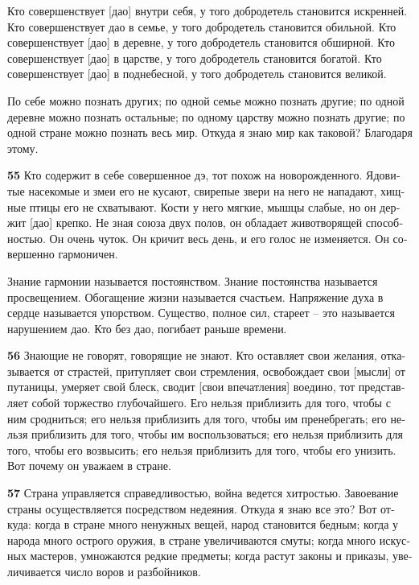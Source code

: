 \documentclass[a4paper]{article}
\begin{document}
{
Кто совершенствует [дао] внутри себя, у того добродетель становится искренней. Кто совершенствует дао в семье, у того
добродетель становится обильной. Кто совершенствует [дао] в деревне, у того добродетель становится обширной. Кто
совершенствует [дао] в царстве, у того добродетель становится богатой. Кто совершенствует [дао] в поднебесной, у того
добродетель становится великой.}

{
По себе можно познать других; по одной семье можно познать другие; по одной деревне можно познать остальные; по одному
царству можно познать другие; по одной стране можно познать весь мир. Откуда я знаю мир как таковой? Благодаря этому.}

{\ttfamily
\foreignlanguage{russian}{\textrm{\textbf{55}}}\foreignlanguage{russian}{\textrm{ Кто содержит в себе совершенное дэ,
тот похож на новорожденного. Ядовитые насекомые и змеи }}\foreignlanguage{russian}{\textrm{его не кусают, свирепые
звери на него не нападают, хищные птицы его не схватывают. Кости у него мягкие, мышцы слабые, но он держит [дао]
крепко. Не зная союза двух полов, он обладает животворящей способностью. Он очень чуток. Он кричит весь день, и его
голос не изменяется. Он совершенно гармоничен.}}}

{
Знание гармонии называется постоянством. Знание постоянства называется просвещением. Обогащение жизни называется
счастьем. Напряжение духа в сердце называется упорством. Существо, полное сил, стареет – это называется нарушением дао.
Кто без дао, погибает раньше времени.}

{\ttfamily
\foreignlanguage{russian}{\textrm{\textbf{56}}}\foreignlanguage{russian}{\textrm{ Знающие не говорят, говорящие не
знают. Кто оставляет свои желания, отказывается от страстей, притупляет свои стремления, освобождает свои [мысли] от
путаницы, умеряет свой блеск, сводит [свои впечатления] воедино, тот представляет собой торжество глубочайшего. Его
нельзя приблизить для того, чтобы с ним сродниться; его нельзя приблизить для того, чтобы им пренебрегать; его нельзя
приблизить для того, чтобы им воспользоваться; его нельзя приблизить для того, чтобы его возвысить; его нельзя
приблизить для того, чтобы его унизить. Вот почему он уважаем в стране.}}}

{\ttfamily
\foreignlanguage{russian}{\textrm{\textbf{57}}}\foreignlanguage{russian}{\textrm{ Страна управляется справедливостью,
война ведется хитростью. Завоевание страны осуществляется посредством недеяния. Откуда я знаю все это? Вот откуда:
когда в стране много ненужных вещей, народ становится бедным; когда у народа много острого оружия, в стране
увеличиваются смуты; когда много искусных мастеров, умножаются редкие предметы; когда растут законы и приказы,
увеличивается число воров и разбойников.}}}
\end{document}
